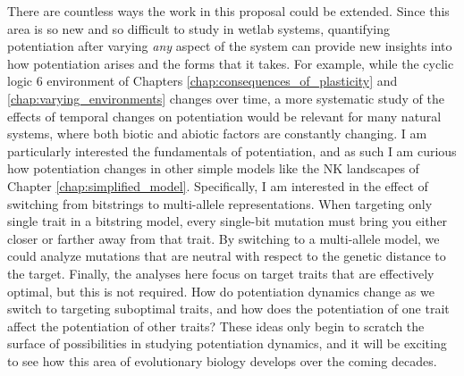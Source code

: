 There are countless ways the work in this proposal could be extended. 
Since this area is so new and so difficult to study in wetlab systems, quantifying potentiation after varying \textit{any} aspect of the system can provide new insights into how potentiation arises and the forms that it takes. 
For example, while the cyclic logic 6 environment of Chapters \ref{chap:consequences_of_plasticity} and \ref{chap:varying_environments} changes over time, a more systematic study of the effects of temporal changes on potentiation would be relevant for many natural systems, where both biotic and abiotic factors are constantly changing. 
I am particularly interested the fundamentals of potentiation, and as such I am curious how potentiation changes in other simple models like the NK landscapes of Chapter \ref{chap:simplified_model}.
Specifically, I am interested in the effect of switching from bitstrings to multi-allele representations. 
When targeting only single trait in a bitstring model, every single-bit mutation must bring you either closer or farther away from that trait. 
By switching to a multi-allele model, we could analyze mutations that are neutral with respect to the genetic distance to the target. 
Finally, the analyses here focus on target traits that are effectively optimal, but this is not required. 
How do potentiation dynamics change as we switch to targeting suboptimal traits, and how does the potentiation of one trait affect the potentiation of other traits?
These ideas only begin to scratch the surface of possibilities in studying potentiation dynamics, and it will be exciting to see how this area of evolutionary biology develops over the coming decades. 






